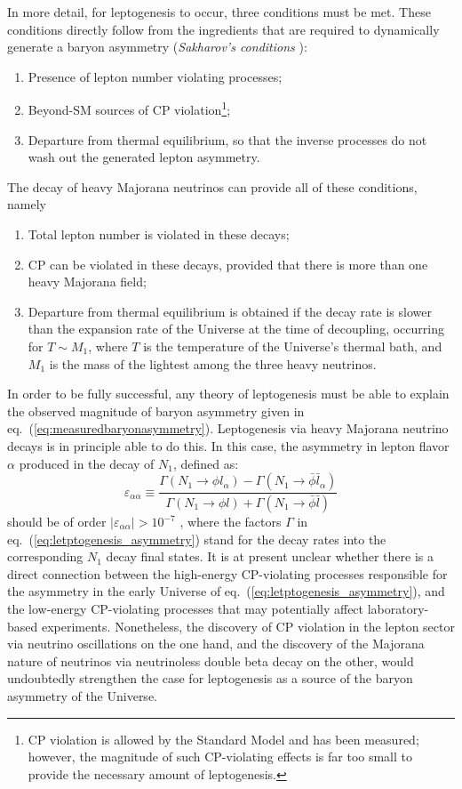 In more detail, for leptogenesis to occur, three conditions must be met. These conditions directly follow from the ingredients that are required to dynamically generate a baryon asymmetry (\emph{Sakharov's conditions} \cite{Sakharov:1967dj}): 
\begin{enumerate}
\item Presence of lepton number violating processes;
\item Beyond-SM sources of CP violation\footnote{CP violation is allowed by the Standard Model and has been measured; however, the magnitude of such CP-violating effects is far too small to provide the necessary amount of leptogenesis.};
\item Departure from thermal equilibrium, so that the inverse processes do not wash out the generated lepton asymmetry.
\end{enumerate}
 The decay of heavy Majorana neutrinos can provide all of these conditions, namely
\begin{enumerate}
\item Total lepton number is violated in these decays;
\item CP can be violated in these decays, provided that there is more than one heavy Majorana field;
\item Departure from thermal equilibrium is obtained if the decay rate is slower than the expansion rate of the Universe at the time of decoupling, occurring for $T\sim M_1$, where $T$ is the temperature of the Universe's thermal bath, and $M_1$ is the mass of the lightest among the three heavy neutrinos. 
\end{enumerate}
In order to be fully successful, any theory of leptogenesis must be able to explain the observed magnitude of baryon asymmetry given in eq.~(\ref{eq:measuredbaryonasymmetry}). Leptogenesis via heavy Majorana neutrino decays is in principle able to do this. In this case, the asymmetry in lepton flavor $\alpha$ produced in the decay of $N_1$, defined as:
\begin{equation}
\varepsilon_{\alpha\alpha}\equiv \frac{\Gamma(N_1\to \phi l_{\alpha})-\Gamma(N_1\to\bar{\phi} \bar{l}_{\alpha})}{\Gamma(N_1\to \phi l)+\Gamma(N_1\to\bar{\phi} \bar{l})}
\label{eq:letptogenesis_asymmetry}
\end{equation}
\noindent should be of order $\lvert\varepsilon_{\alpha\alpha}\rvert>10^{-7}$ \cite{Davidson:2008bu}, where the factors $\Gamma$ in eq.~(\ref{eq:letptogenesis_asymmetry}) stand for the decay rates into the corresponding $N_1$ decay final states. It is at present unclear whether there is a direct connection between the high-energy CP-violating processes responsible for the asymmetry in the early Universe of eq.~(\ref{eq:letptogenesis_asymmetry}), and the low-energy CP-violating processes that may potentially affect laboratory-based experiments. Nonetheless, the discovery of CP violation in the lepton sector via neutrino oscillations on the one hand, and the discovery of the Majorana nature of neutrinos via neutrinoless double beta decay on the other, would undoubtedly strengthen the case for leptogenesis as a source of the baryon asymmetry of the Universe.

